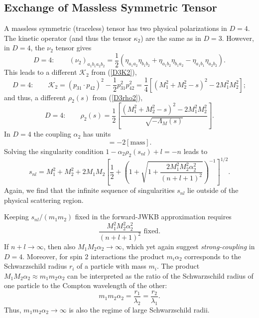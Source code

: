 \subsection{Exchange of Massless Symmetric Tensor}
A massless symmetric (traceless) tensor has two physical polarizations in $D = 4$. The kinetic operator (and thus the tensor $\kappa_{2}$) are the same as in $D = 3$. However, in $D = 4$, the $\nu_{2}$ tensor gives
\begin{equation}
	D = 4: \qquad (\nu_{2})_{a_{1}b_{1} a_{2} b_{2}} = \frac{1}{2} \left( \eta_{a_{1} a_{2}} \eta_{b_{1} b_{2}} + \eta_{a_{1}b_{2}} \eta_{b_{1}a_{2}} - \eta_{a_{1}b_{1}} \eta_{a_{2}b_{2}} \right).
\end{equation}
This leads to a different $\mathcal{K}_{2}$ from (\ref{D3K2}),
\begin{equation}
	D = 4: \qquad \mathcal{K}_{2} = (p_{31} \cdot p_{42})^{2} - \frac{1}{2} p_{31}^{2} p_{42}^{2} = \frac{1}{4} \left[ (M_{1}^{2} + M_{2}^{2} - s)^{2} - 2 M_{1}^{2} M_{2}^{2} \right];
\end{equation}
and thus, a different $\rho_{2}(s)$ from (\ref{D3rho2}),
\begin{equation}
	D = 4: \qquad \rho_{2}(s) = \frac{1}{2} \left[ \frac{(M_{1}^{2} + M_{2}^{2} - s)^{2} - 2 M_{1}^{2} M_{2}^{2}}{\sqrt{-\Lambda_{M}(s)}} \right].
\end{equation}
In $D = 4$ the coupling $\alpha_{2}$ has units
\begin{equation}
	[\alpha_{2}] = -2 [\text{mass}].
\end{equation}
Solving the singularity condition $1 - \alpha_{2} \rho_{2}(s_{nl}) + l = -n$ leads to
\begin{equation}
	s_{nl} = M_{1}^{2} + M_{2}^{2} + 2M_{1}M_{2} \left[ \frac{1}{2} + \left(1 + \sqrt{1 + \frac{2 M_{1}^{2} M_{2}^{2} \alpha_{2}^{2}}{(n + l + 1)^{2}}} \right)^{-1} \right]^{1/2}.
	\label{sJ2}
\end{equation}
Again, we find that the infinite sequence of singularities $s_{nl}$ lie outside of the physical scattering region.

Keeping $s_{nl}/(m_{1}m_{2})$ fixed in the forward-JWKB approximation requires
\begin{equation}
	\frac{M_{1}^{2} M_{2}^{2} \alpha_{2}^{2}}{(n + l + 1)^{2}} \text{ fixed}.
\end{equation}
If $n + l \rightarrow \infty$, then also $M_{1} M_{2} \alpha_{2} \rightarrow \infty$, which yet again suggest \textit{strong-coupling} in $D = 4$. Moreover, for spin 2 interactions the product $m_{i} \alpha_{2}$ corresponds to the Schwarzschild radius $r_{i}$ of a particle with mass $m_{i}$. The product $M_{1} M_{2} \alpha_{2} \approx m_{1} m_{2} \alpha_{2}$ can be interpreted as the ratio of the Schwarzschild radius of one particle to the Compton wavelength of the other:
\begin{equation}
	m_{1} m_{2} \alpha_{2} = \frac{r_{1}}{\lambda_{2}} = \frac{r_{2}}{\lambda_{1}}.
\end{equation}
Thus, $m_{1} m_{2} \alpha_{2} \rightarrow \infty$ is also the regime of large Schwarzschild radii.